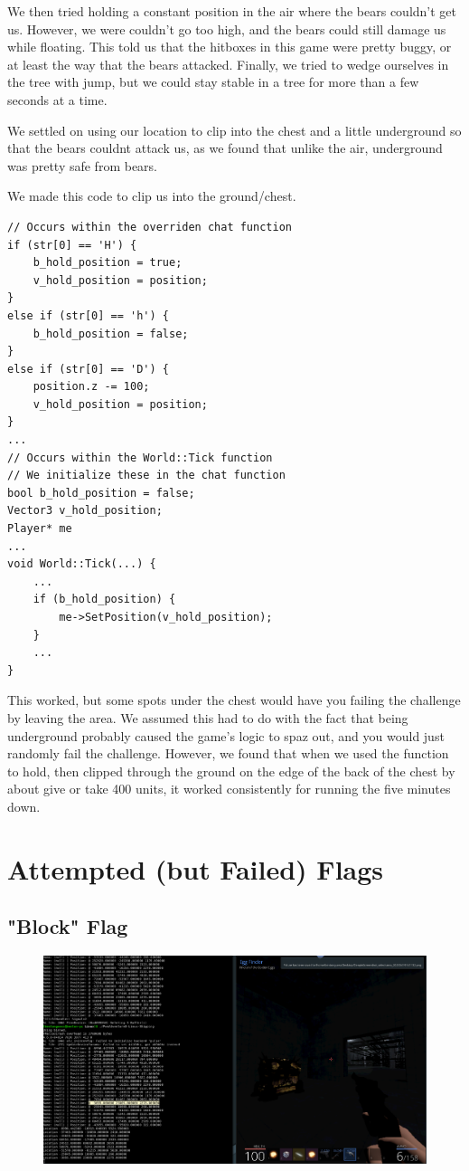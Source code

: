 \documentclass[11pt]{article}
\begin{document}
We then tried holding a constant position in the air where the bears couldn't get us. However, we were couldn't go too high, and the bears could still damage us while floating. This told us that the hitboxes in this game were pretty buggy, or at least the way that the bears attacked. Finally, we tried to wedge ourselves in the tree with jump, but we could stay stable in a tree for more than a few seconds at a time.

We settled on using our location to clip into the chest and a little underground so that the bears couldnt attack us, as we found that unlike the air, underground was pretty safe from bears.

We made this code to clip us into the ground/chest.

\begin{lstlisting}
// Occurs within the overriden chat function
if (str[0] == 'H') {
    b_hold_position = true;
    v_hold_position = position;
}
else if (str[0] == 'h') {
    b_hold_position = false;
}
else if (str[0] == 'D') {
    position.z -= 100;
    v_hold_position = position;
} 
... 
// Occurs within the World::Tick function
// We initialize these in the chat function
bool b_hold_position = false;
Vector3 v_hold_position;
Player* me
...
void World::Tick(...) {
    ...
    if (b_hold_position) {
        me->SetPosition(v_hold_position);
    }
    ...
}
\end{lstlisting}

This worked, but some spots under the chest would have you failing the challenge by leaving the area. We assumed this had to do with the fact that being underground probably caused the game's logic to spaz out, and you would just randomly fail the challenge. However, we found that when we used the function to hold, then clipped through the ground on the edge of the back of the chest by about give or take 400 units, it worked consistently for running the five minutes down.

\section*{Attempted (but Failed) Flags}

\subsection*{"Block" Flag}

\begin{figure}[H]
    \centering
    \includegraphics[width=1.00\linewidth]{block.png}
\end{figure}
\end{document}
